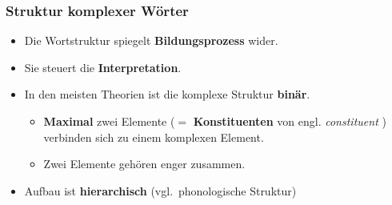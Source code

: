 \begin{frame}
\frametitle{Struktur komplexer Wörter}

\begin{minipage}{.65\textwidth}

	\begin{itemize}
		\item Die Wortstruktur spiegelt \textbf{Bildungsprozess} wider.
		\item Sie steuert die \textbf{Interpretation}.
		\item In den meisten Theorien ist die komplexe Struktur \textbf{binär}.
		
		\begin{itemize}
			\item \textbf{Maximal} zwei Elemente ($=$ \textbf{Konstituenten} von engl. \emph{constituent} ) verbinden sich zu einem komplexen Element.
			\item Zwei Elemente gehören enger zusammen.
		\end{itemize}
		\item Aufbau ist \textbf{hierarchisch} (vgl.\ phonologische Struktur)
	\end{itemize}

\end{minipage}
%
\hfill%
%
\begin{minipage}{.34\textwidth}
\begin{figure}	
\centering
\scalebox{0.7}{
\begin{forest} 
	[Haustürschlüssel
		[Haustür
			[Haus] 
			[Tür]]
		[Schlüssel]]									
\end{forest}}

\vspace{.75cm}

\scalebox{.7}{
\begin{forest}
	[Zugverbindung
		[Zug]
		[Verbindung
			[verbind
				[ver-]
				[bind]]
			[-ung]]]
\end{forest}}
\end{figure}
\end{minipage}

\end{frame}


